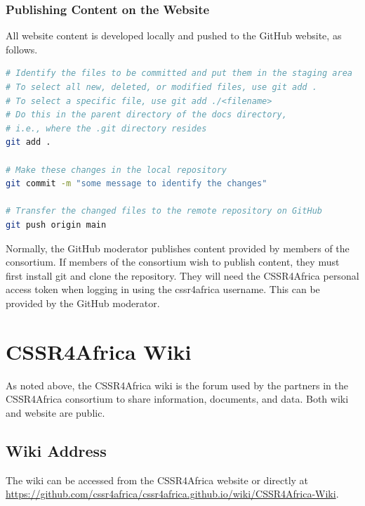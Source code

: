 \documentclass{CSSRforAfrica}
\begin{document}
\subsubsection{Publishing Content on the Website}
All website content is developed locally and pushed to the GitHub website, as follows.

\begin{lstlisting}[style=Numbering, language=bash]
# Identify the files to be committed and put them in the staging area
# To select all new, deleted, or modified files, use git add . 
# To select a specific file, use git add ./<filename>
# Do this in the parent directory of the docs directory, 
# i.e., where the .git directory resides
git add .   

# Make these changes in the local repository
git commit -m "some message to identify the changes"

# Transfer the changed files to the remote repository on GitHub
git push origin main
\end{lstlisting}

Normally, the GitHub moderator publishes content provided by members of the consortium. If members of the consortium wish to publish content, they must first install git and clone the repository.  They will need the CSSR4Africa personal access token when logging in using the cssr4africa username. This can be provided by the  GitHub moderator. 

\newpage

\section{CSSR4Africa Wiki}
\label{section:wiki}


As noted above, the CSSR4Africa wiki is the forum used by the partners in the CSSR4Africa consortium to share information, documents, and data. Both wiki and website are public.  

\subsection{Wiki Address}

The wiki can be accessed from the CSSR4Africa website or directly at {\small \url{https://github.com/cssr4africa/cssr4africa.github.io/wiki/CSSR4Africa-Wiki}}.
\end{document}
